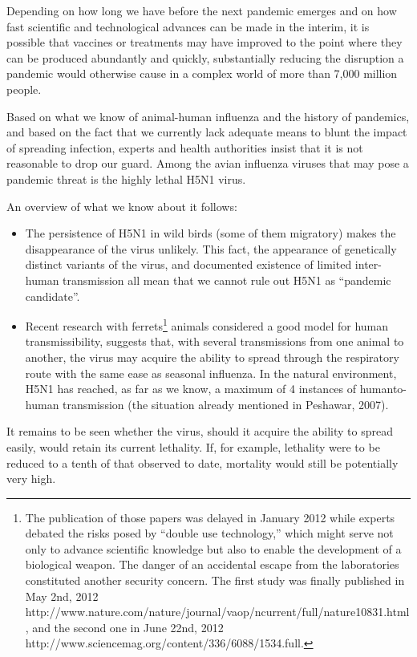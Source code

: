 \documentclass[12pt, a4]{scrartcl}
\begin{document}
Depending on how long we have before the next pandemic emerges and on how fast scientific and technological advances can be made in the interim, it is possible that vaccines or treatments may have improved to the point where they can be produced abundantly and quickly, substantially reducing the disruption a pandemic would otherwise cause in a complex world of more than 7,000 million people.

Based on what we know of animal-human influenza and the history of pandemics, and based on the fact that we currently lack adequate means to blunt the impact of spreading infection, experts and health authorities insist that it is not reasonable to drop our guard. Among the avian influenza viruses that may pose a pandemic threat is the highly lethal H5N1 virus.

An overview of what we know about it follows:

\begin{itemize}
\item The persistence of H5N1 in wild birds (some of them migratory) makes the disappearance of the virus unlikely. This fact, the appearance of genetically distinct variants of the virus, and documented existence of limited inter-human transmission all mean that we cannot rule out H5N1 as “pandemic candidate”.
\item Recent research with ferrets\footnote{The publication of those papers was delayed in January 2012 while experts debated the risks posed by “double use technology,” which might serve not only to advance scientific knowledge but also to enable the development of a biological weapon. The danger of an accidental escape from the laboratories constituted another security concern. The first study was finally published in May 2nd, 2012 http://www.nature.com/nature/journal/vaop/ncurrent/full/nature10831.html, and the second one in June 22nd, 2012 http://www.sciencemag.org/content/336/6088/1534.full.} animals considered a good model for human transmissibility, suggests that, with several transmissions from one animal to another, the virus may acquire the ability to spread through the respiratory route with the same ease as seasonal influenza. In the natural environment, H5N1 has reached, as far as we know, a maximum of 4 instances of humanto-human transmission (the situation already mentioned in Peshawar, 2007).
\end{itemize}

It remains to be seen whether the virus, should it acquire the ability to spread easily, would retain its current lethality. If, for example, lethality were to be reduced to a tenth of that observed to date, mortality would still be potentially very high.
\end{document}
